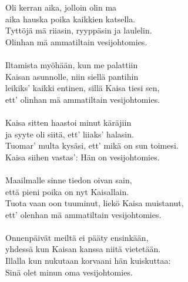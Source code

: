 
        Oli kerran aika, jolloin olin ma \\
        aika hauska poika kaikkien katsella. \\
        Tyttöjä mä riiasin, ryyppäsin ja laulelin. \\
        Olinhan mä ammatiltain vesijohtomies. \\
\hspace{10mm} \\
        Iltamista myöhään, kun me palattiin \\
        Kaisan asunnolle, niin siellä pantihin \\
        leikiks' kaikki entinen, sillä Kaisa tiesi sen, \\
        ett' olinhan mä ammatiltain vesijohtomies. \\
\hspace{10mm} \\
        Kaisa sitten haastoi minut käräjiin \\
        ja syyte oli siitä, ett' liiaks' halasin. \\
        Tuomar' multa kysäsi, ett' mikä on sun toimesi. \\
        Kaisa siihen vastas': Hän on vesijohtomies. \\
\hspace{10mm} \\
        Maailmalle sinne tiedon oivan sain, \\
        että pieni poika on nyt Kaisallain. \\
        Tuota vaan oon tuuminut, liekö Kaisa muistanut, \\
        ett' olenhan mä ammatiltain vesijohtomies. \\
\hspace{10mm} \\
        Onnenpäivät meiltä ei pääty ensinkään, \\
        yhdessä kun Kaisan kanssa niitä vietetään. \\
        Illalla kun nukutaan korvaani hän kuiskuttaa: \\
        Sinä olet minun oma vesijohtomies. \\
